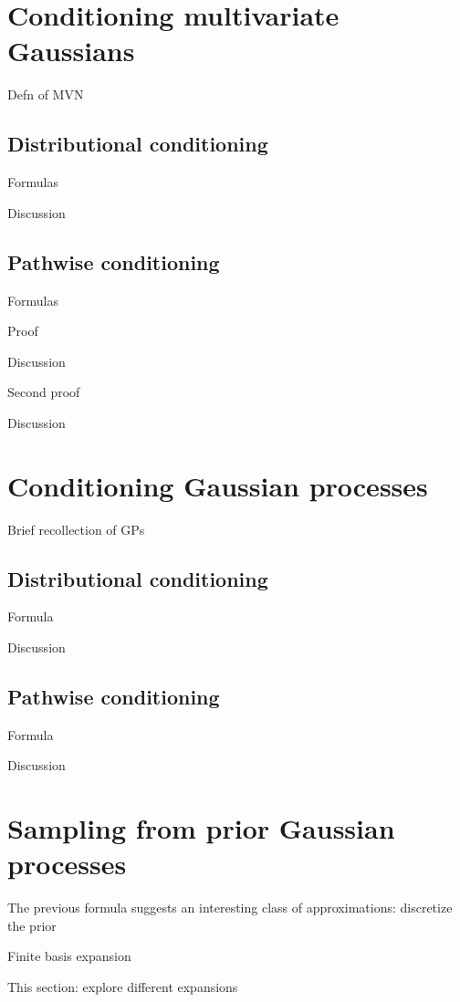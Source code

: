 \documentclass[11pt]{book}
\begin{document}
\section{Conditioning multivariate Gaussians}

Defn of MVN

\subsection{Distributional conditioning}

Formulas

Discussion

\subsection{Pathwise conditioning}

Formulas

Proof

Discussion

Second proof

Discussion

\section{Conditioning Gaussian processes}

Brief recollection of GPs 

\subsection{Distributional conditioning}

Formula

Discussion

\subsection{Pathwise conditioning}

Formula

Discussion

\section{Sampling from prior Gaussian processes}

The previous formula suggests an interesting class of approximations: discretize the prior

Finite basis expansion

This section: explore different expansions
\end{document}
